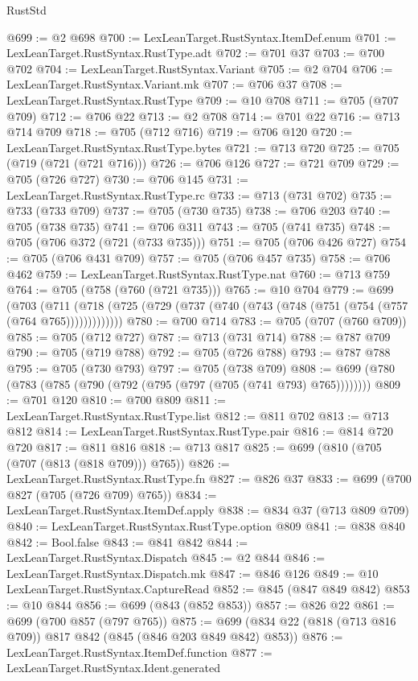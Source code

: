 \begin{lexlean}{RustStd}
\begin{coremodule}
@699 := @2 @698
@700 := LexLeanTarget.RustSyntax.ItemDef.enum
@701 := LexLeanTarget.RustSyntax.RustType.adt
@702 := @701 @37
@703 := @700 @702
@704 := LexLeanTarget.RustSyntax.Variant
@705 := @2 @704
@706 := LexLeanTarget.RustSyntax.Variant.mk
@707 := @706 @37
@708 := LexLeanTarget.RustSyntax.RustType
@709 := @10 @708
@711 := @705 (@707 @709)
@712 := @706 @22
@713 := @2 @708
@714 := @701 @22
@716 := @713 @714 @709
@718 := @705 (@712 @716)
@719 := @706 @120
@720 := LexLeanTarget.RustSyntax.RustType.bytes
@721 := @713 @720
@725 := @705 (@719 (@721 (@721 @716)))
@726 := @706 @126
@727 := @721 @709
@729 := @705 (@726 @727)
@730 := @706 @145
@731 := LexLeanTarget.RustSyntax.RustType.rc
@733 := @713 (@731 @702)
@735 := @733 (@733 @709)
@737 := @705 (@730 @735)
@738 := @706 @203
@740 := @705 (@738 @735)
@741 := @706 @311
@743 := @705 (@741 @735)
@748 := @705 (@706 @372 (@721 (@733 @735)))
@751 := @705 (@706 @426 @727)
@754 := @705 (@706 @431 @709)
@757 := @705 (@706 @457 @735)
@758 := @706 @462
@759 := LexLeanTarget.RustSyntax.RustType.nat
@760 := @713 @759
@764 := @705 (@758 (@760 (@721 @735)))
@765 := @10 @704
@779 := @699
    (@703 (@711 (@718 (@725 (@729 (@737 (@740 (@743 (@748 (@751 (@754 (@757 (@764 @765)))))))))))))
@780 := @700 @714
@783 := @705 (@707 (@760 @709))
@785 := @705 (@712 @727)
@787 := @713 (@731 @714)
@788 := @787 @709
@790 := @705 (@719 @788)
@792 := @705 (@726 @788)
@793 := @787 @788
@795 := @705 (@730 @793)
@797 := @705 (@738 @709)
@808 := @699 (@780 (@783 (@785 (@790 (@792 (@795 (@797 (@705 (@741 @793) @765))))))))
@809 := @701 @120
@810 := @700 @809
@811 := LexLeanTarget.RustSyntax.RustType.list
@812 := @811 @702
@813 := @713 @812
@814 := LexLeanTarget.RustSyntax.RustType.pair
@816 := @814 @720 @720
@817 := @811 @816
@818 := @713 @817
@825 := @699 (@810 (@705 (@707 (@813 (@818 @709))) @765))
@826 := LexLeanTarget.RustSyntax.RustType.fn
@827 := @826 @37
@833 := @699 (@700 @827 (@705 (@726 @709) @765))
@834 := LexLeanTarget.RustSyntax.ItemDef.apply
@838 := @834 @37 (@713 @809 @709)
@840 := LexLeanTarget.RustSyntax.RustType.option @809
@841 := @838 @840
@842 := Bool.false
@843 := @841 @842
@844 := LexLeanTarget.RustSyntax.Dispatch
@845 := @2 @844
@846 := LexLeanTarget.RustSyntax.Dispatch.mk
@847 := @846 @126
@849 := @10 LexLeanTarget.RustSyntax.CaptureRead
@852 := @845 (@847 @849 @842)
@853 := @10 @844
@856 := @699 (@843 (@852 @853))
@857 := @826 @22
@861 := @699 (@700 @857 (@797 @765))
@875 := @699 (@834 @22 (@818 (@713 @816 @709)) @817 @842 (@845 (@846 @203 @849 @842) @853))
@876 := LexLeanTarget.RustSyntax.ItemDef.function
@877 := LexLeanTarget.RustSyntax.Ident.generated

\end{coremodule}
\end{lexlean}

